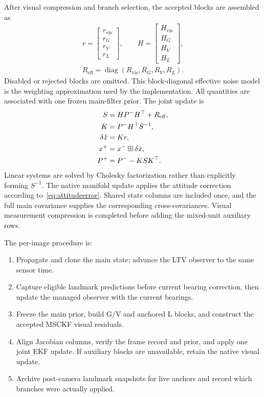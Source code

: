 \documentclass[a4paper,runningheads,twocolumn]{llncs}
\newcommand{\diag}{\operatorname{diag}}
\begin{document}
After visual compression and branch selection, the accepted blocks are assembled as
\begin{equation}
 \begin{gathered}
 r=\begin{bmatrix}r_{\mathrm{vis}}\\r_G\\r_V\\r_L\end{bmatrix},\qquad
 H=\begin{bmatrix}H_{\mathrm{vis}}\\H_G\\H_V\\H_L\end{bmatrix},\\
 R_{\mathrm{eff}}=\diag(R_{\mathrm{vis}},R_G,R_V,R_L).
 \end{gathered}
 \label{eq:joint}
\end{equation}
Disabled or rejected blocks are omitted. This block-diagonal effective noise model is the weighting approximation used by the implementation. All quantities are associated with one frozen main-filter prior. The joint update is
\begin{align}
 S&=HP^-H^\top+R_{\mathrm{eff}},\\
 K&=P^-H^\top S^{-1},\notag\\
 \delta\hat x&=Kr,\notag\\
 x^+&=x^-\boxplus\delta\hat x,\notag\\
 P^+&=P^--KSK^\top .
 \label{eq:ekf}
\end{align}
Linear systems are solved by Cholesky factorization rather than explicitly forming $S^{-1}$. The native manifold update applies the attitude correction according to~\eqref{eq:attitudeerror}. Shared state columns are included once, and the full main covariance supplies the corresponding cross-covariances. Visual measurement compression is completed before adding the mixed-unit auxiliary rows.

The per-image procedure is:
\begin{enumerate}
\item Propagate and clone the main state; advance the LTV observer to the same sensor time.
\item Capture eligible landmark predictions before current bearing correction, then update the managed observer with the current bearings.
\item Freeze the main prior, build G/V and anchored L blocks, and construct the accepted MSCKF visual residuals.
\item Align Jacobian columns, verify the frame record and prior, and apply one joint EKF update. If auxiliary blocks are unavailable, retain the native visual update.
\item Archive post-camera landmark snapshots for live anchors and record which branches were actually applied.
\end{enumerate}
\end{document}
